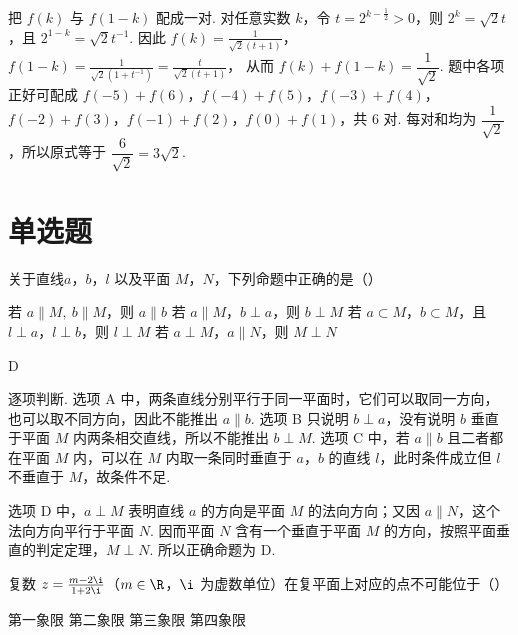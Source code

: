 \begin{solution}
把 \(f(k)\) 与 \(f(1-k)\) 配成一对. 对任意实数 \(k\)，令 \(t=2^{k-\frac{1}{2}}>0\)，则 \(2^k=\sqrt{2}t\)，且 \(2^{1-k}=\sqrt{2}t^{-1}\). 因此
\(f(k)=\frac{1}{\sqrt{2}(t+1)}\)，\(f(1-k)=\frac{1}{\sqrt{2}(1+t^{-1})}=\frac{t}{\sqrt{2}(t+1)}\)，
从而 \(f(k)+f(1-k)=\dfrac{1}{\sqrt{2}}\). 题中各项正好可配成
\(f(-5)+f(6)\)，\(f(-4)+f(5)\)，\(f(-3)+f(4)\)，\(f(-2)+f(3)\)，\(f(-1)+f(2)\)，\(f(0)+f(1)\)，共 \(6\) 对. 每对和均为 \(\dfrac{1}{\sqrt{2}}\)，所以原式等于 \(\dfrac{6}{\sqrt{2}}=3\sqrt{2}\).
\end{solution}

\section{单选题}
\begin{problem}
关于直线\(a\)，\(b\)，\(l\) 以及平面 \(M\)，\(N\)，下列命题中正确的是（\quad）

\choices
    {若 \(a \parallel M,\ b \parallel M\)，则 \(a \parallel b\)}
    {若 \(a \parallel M\)，\(b \perp a\)，则 \(b \perp M\)}
    {若 \(a \subset M\)，\(b \subset M\)，且 \(l \perp a\)，\(l \perp b\)，则 \(l \perp M\)}
    {若 \(a \perp M\)，\(a \parallel N\)，则 \(M \perp N\)}
\end{problem}

\begin{answer}
D
\end{answer}

\begin{solution}
逐项判断. 选项 A 中，两条直线分别平行于同一平面时，它们可以取同一方向，也可以取不同方向，因此不能推出 \(a\parallel b\). 选项 B 只说明 \(b\perp a\)，没有说明 \(b\) 垂直于平面 \(M\) 内两条相交直线，所以不能推出 \(b\perp M\). 选项 C 中，若 \(a\parallel b\) 且二者都在平面 \(M\) 内，可以在 \(M\) 内取一条同时垂直于 \(a\)，\(b\) 的直线 \(l\)，此时条件成立但 \(l\) 不垂直于 \(M\)，故条件不足.

选项 D 中，\(a\perp M\) 表明直线 \(a\) 的方向是平面 \(M\) 的法向方向；又因 \(a\parallel N\)，这个法向方向平行于平面 \(N\). 因而平面 \(N\) 含有一个垂直于平面 \(M\) 的方向，按照平面垂直的判定定理，\(M\perp N\). 所以正确命题为 D.
\end{solution}

\begin{problem}
复数 \(z = \frac{m - 2\i}{1 + 2\i}\)（\(m \in \R\)，\(\i\) 为虚数单位）在复平面上对应的点不可能位于（\quad）

\choices
    {第一象限}
    {第二象限}
    {第三象限}
    {第四象限}
\end{problem}

